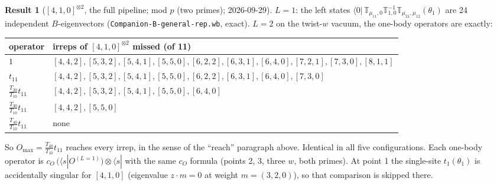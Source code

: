 \documentclass[11pt]{article}
\newcommand{\nb}[1]{\texttt{#1}}
\newcommand{\vac}{\langle 0|}
\theoremstyle{definition}
\newtheorem{result}{Result}
\theoremstyle{remark}
\begin{document}
\begin{result}[{$[4,1,0]^{\otimes2}$, the full pipeline; mod $p$ (two primes); 2026-09-29}]
$L=1$: the left states $\vac\,\mathbb T_{\mu_{11},0}\mathbb T_{1,0}^{-1}\mathbb T_{\mu_{21},\mu_{12}}(\theta_1)$ are 24 independent $B$-eigenvectors (\nb{Companion-B-general-rep.wb}, exact). $L=2$ on the twist-$w$ vacuum, the one-body operators are exactly:
\begin{center}
\begin{tabular}{ll}\toprule
operator & irreps of $[4,1,0]^{\otimes2}$ missed (of 11)\\\midrule
$1$ & $[4,4,2],[5,3,2],[5,4,1],[5,5,0],[6,2,2],[6,3,1],[6,4,0],[7,2,1],[7,3,0],[8,1,1]$\\
$t_{11}$ & $[4,4,2],[5,3,2],[5,4,1],[5,5,0],[6,2,2],[6,3,1],[6,4,0],[7,3,0]$\\
$\tfrac{T_{20}}{T_{10}}t_{11}$ & $[4,4,2],[5,3,2],[5,4,1],[5,5,0],[6,4,0]$\\
$\tfrac{T_{30}}{T_{10}}t_{11}$ & $[4,4,2],[5,5,0]$\\
$\tfrac{T_{40}}{T_{10}}t_{11}$ & none\\\bottomrule
\end{tabular}
\end{center}
So $O_{\max}=\tfrac{T_{40}}{T_{10}}t_{11}$ reaches every irrep, in the sense of the ``reach'' paragraph above. Identical in all five configurations. Each one-body operator is $c_O\,(\langle s|O^{(L=1)})\otimes\langle s|$ with the same $c_O$ formula (points 2, 3, three $w$, both primes). At point 1 the single-site $t_1(\theta_1)$ is accidentally singular for $[4,1,0]$ (eigenvalue $z\cdot m=0$ at weight $m=(3,2,0)$), so that comparison is skipped there.
\end{result}
\end{document}
